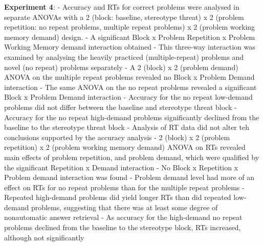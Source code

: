 \documentclass[
  doc, a4paper]{apa7}
\begin{document}
\textbf{Experiment 4}:
- Accuracy and RTs for correct problems were analysed in separate ANOVAs with a 2 (block: baseline, stereotype threat) x 2 (problem repetition: no repeat problems, multiple repeat problems) x 2 (problem working memory demand) design.
- A significant Block x Problem Repetition x Problem Working Memory demand interaction obtained
- This three-way interaction was examined by analysing the heavily practiced (multiple-repeat) problems and novel (no repeat) problems separately
- A 2 (block) x 2 (problem demand) ANOVA on the multiple repeat problems revealed no Block x Problem Demand interaction
- The same ANOVA on the no repeat problems revealed a significant Block x Problem Demand interaction
- Accuracy for the no repeat low-demand problems did not differ between the baseline and stereotype threat block
- Accuracy for the no repeat high-demand problems significantly declined from the baseline to the stereotype threat block
- Analysis of RT data did not alter teh conclusions supported by the accuracy analysis
- 2 (block) x 2 (problem repetition) x 2 (problem working memory demand) ANOVA on RTs revealed main effects of problem repetition, and problem demand, which were qualified by the significant Repetition x Demand interaction
- No Block x Repetition x Problem demand interaction was found
- Problem demand level had more of an effect on RTs for no repeat problems than for the multiple repeat problems
- Repeated high-demand problems did yield longer RTs than did repeated low-demand problems, suggesting that there was at least some degree of nonautomatic answer retrieval
- As accuracy for the high-demand no repeat problems declined from the baseline to the stereotype block, RTs increased, although not significantly
\end{document}
